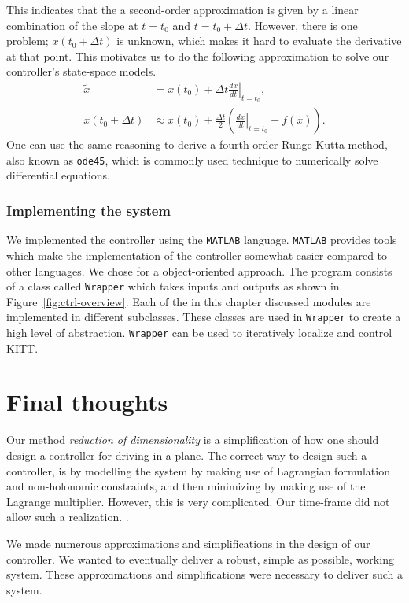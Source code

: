 \documentclass[11pt,titlepage]{report}
\begin{document}
This indicates that the a second-order approximation is given by a linear combination of the slope at $t=t_0$ and $t=t_0+\Delta t$. However, there is one problem; $x(t_0 + \Delta t)$ is unknown, which makes it hard to evaluate the derivative at that point. This motivates us to do the following approximation to solve our controller's state-space models.
\begin{align}
\tilde{x} &= x(t_0)+ \Delta t \left. \frac{dx}{dt} \right|_{t=t_0}, \nonumber \\
x(t_0+\Delta t) &\approx x(t_0) + \frac{\Delta t}{2}\left(\left. \frac{dx}{dt} \right|_{t=t_0} + f(\tilde{x})\right).\nonumber 
\end{align}
One can use the same reasoning to derive a fourth-order Runge-Kutta method, also known as \texttt{ode45}, which is commonly used technique to numerically solve differential equations.

\subsubsection{Implementing the system}
We implemented the controller using the \texttt{MATLAB} language. \texttt{MATLAB} provides tools which make the implementation of the controller somewhat easier compared to other languages. We chose for a object-oriented approach. The program consists of a class called \texttt{Wrapper} which takes inputs and outputs as shown in Figure~\ref{fig:ctrl-overview}. Each of the in this chapter discussed modules are implemented in different subclasses. These classes are used in \texttt{Wrapper} to create a high level of abstraction. \texttt{Wrapper} can be used to iteratively localize and control KITT.

\section{Final thoughts}
Our method \textit{reduction of dimensionality} is a simplification of how one should design a controller for driving in a plane. The correct way to design such a controller, is by modelling the system by making use of Lagrangian formulation and non-holonomic constraints, and then minimizing by making use of the Lagrange multiplier. However, this is very complicated. Our time-frame did not allow such a realization. \cite{epo4-manual}.

We made numerous approximations and simplifications in the design of our controller. We wanted to eventually deliver a robust, simple as possible, working system. These approximations and simplifications were necessary to deliver such a system.
\end{document}
